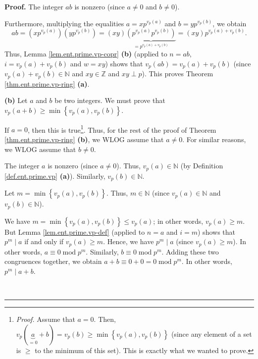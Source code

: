 \documentclass[numbers=enddot,12pt,final,onecolumn,notitlepage]{scrartcl}%
\numberwithin{exer}{subsection}
\theoremstyle{definition}
\newenvironment{proof}[1][Proof]{\noindent\textbf{#1.} }{\ \rule{0.5em}{0.5em}}
\begin{document}
\begin{proof}
The integer $ab$ is nonzero (since $a\neq0$ and $b\neq0$).

Furthermore, multiplying the equalities $a=xp^{v_{p}\left(  a\right)  }$ and
$b=yp^{v_{p}\left(  b\right)  }$, we obtain%
\[
ab=\left(  xp^{v_{p}\left(  a\right)  }\right)  \left(  yp^{v_{p}\left(
b\right)  }\right)  =\left(  xy\right)  \underbrace{\left(  p^{v_{p}\left(
a\right)  }p^{v_{p}\left(  b\right)  }\right)  }_{=p^{v_{p}\left(  a\right)
+v_{p}\left(  b\right)  }}=\left(  xy\right)  p^{v_{p}\left(  a\right)
+v_{p}\left(  b\right)  }.
\]
Thus, Lemma \ref{lem.ent.prime.vp-copr} \textbf{(b)} (applied to $n=ab$,
$i=v_{p}\left(  a\right)  +v_{p}\left(  b\right)  $ and $w=xy$) shows that
$v_{p}\left(  ab\right)  =v_{p}\left(  a\right)  +v_{p}\left(  b\right)  $
(since $v_{p}\left(  a\right)  +v_{p}\left(  b\right)  \in\mathbb{N}$ and
$xy\in\mathbb{Z}$ and $xy\perp p$). This proves Theorem
\ref{thm.ent.prime.vp-ring} \textbf{(a)}.

\textbf{(b)} Let $a$ and $b$ be two integers. We must prove that $v_{p}\left(
a+b\right)  \geq\min\left\{  v_{p}\left(  a\right)  ,v_{p}\left(  b\right)
\right\}  $.

If $a=0$, then this is true\footnote{\textit{Proof.} Assume that $a=0$. Then,
$v_{p}\left(  \underbrace{a}_{=0}+b\right)  =v_{p}\left(  b\right)  \geq
\min\left\{  v_{p}\left(  a\right)  ,v_{p}\left(  b\right)  \right\}  $ (since
any element of a set is $\geq$ to the minimum of this set). This is exactly
what we wanted to prove.}. Thus, for the rest of the proof of Theorem
\ref{thm.ent.prime.vp-ring} \textbf{(b)}, we WLOG assume that $a\neq0$. For
similar reasons, we WLOG assume that $b\neq0$.

The integer $a$ is nonzero (since $a\neq0$). Thus, $v_{p}\left(  a\right)
\in\mathbb{N}$ (by Definition \ref{def.ent.prime.vp} \textbf{(a)}). Similarly,
$v_{p}\left(  b\right)  \in\mathbb{N}$.

Let $m=\min\left\{  v_{p}\left(  a\right)  ,v_{p}\left(  b\right)  \right\}
$. Thus, $m\in\mathbb{N}$ (since $v_{p}\left(  a\right)  \in\mathbb{N}$ and
$v_{p}\left(  b\right)  \in\mathbb{N}$).

We have $m=\min\left\{  v_{p}\left(  a\right)  ,v_{p}\left(  b\right)
\right\}  \leq v_{p}\left(  a\right)  $; in other words, $v_{p}\left(
a\right)  \geq m$. But Lemma \ref{lem.ent.prime.vp-def} (applied to $n=a$ and
$i=m$) shows that $p^{m}\mid a$ if and only if $v_{p}\left(  a\right)  \geq
m$. Hence, we have $p^{m}\mid a$ (since $v_{p}\left(  a\right)  \geq m$). In
other words, $a\equiv0\operatorname{mod}p^{m}$. Similarly, $b\equiv
0\operatorname{mod}p^{m}$. Adding these two congruences together, we obtain
$a+b\equiv0+0=0\operatorname{mod}p^{m}$. In other words, $p^{m}\mid a+b$.


\end{proof}
\end{document}
